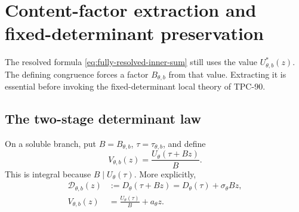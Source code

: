 \section{Content-factor extraction and fixed-determinant preservation}
\label{sec:determinant-law}

The resolved formula \eqref{eq:fully-resolved-inner-sum} still uses
the value \(U_{\theta,b}^\ast(z)\).  The defining congruence forces a
factor \(B_{\theta,b}\) from that value.  Extracting it is essential
before invoking the fixed-determinant local theory of TPC-90.

\subsection{The two-stage determinant law}

On a soluble branch, put \(B=B_{\theta,b}\),
\(\tau=\tau_{\theta,b}\), and define
\begin{equation}
 V_{\theta,b}(z)
 =
 \frac{U_\theta(\tau+Bz)}{B}.
\label{eq:det-reduced-V}
\end{equation}
This is integral because \(B\mid U_\theta(\tau)\).  More explicitly,
\begin{align}
 \mathcal D_{\theta,b}(z)
 &:=
 D_\theta(\tau+Bz)
 =
 D_\theta(\tau)+\sigma_\theta Bz,
\label{eq:det-reduced-D}\\
 V_{\theta,b}(z)
 &=
 \frac{U_\theta(\tau)}B+a_\theta z.
\label{eq:det-reduced-V-affine}
\end{align}

